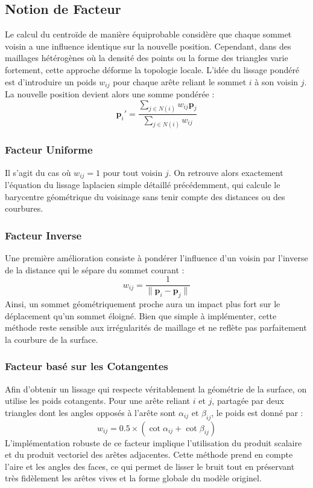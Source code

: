 \documentclass[11pt,a4paper]{article}
\begin{document}
\subsection{Notion de Facteur}
Le calcul du centroïde de manière équiprobable considère que chaque sommet voisin a une influence identique sur la nouvelle position. Cependant, dans des maillages hétérogènes où la densité des points ou la forme des triangles varie fortement, cette approche déforme la topologie locale.
L'idée du lissage pondéré est d'introduire un poids $w_{ij}$ pour chaque arête reliant le sommet $i$ à son voisin $j$. La nouvelle position devient alors une somme pondérée :
\begin{equation}
\mathbf{p}_i' = \frac{\sum_{j \in N(i)} w_{ij} \mathbf{p}_j}{\sum_{j \in N(i)} w_{ij}}
\end{equation}

\subsubsection{Facteur Uniforme}
Il s'agit du cas où $w_{ij} = 1$ pour tout voisin $j$. On retrouve alors exactement l'équation du lissage laplacien simple détaillé précédemment, qui calcule le barycentre géométrique du voisinage sans tenir compte des distances ou des courbures.
\subsubsection{Facteur Inverse}
Une première amélioration consiste à pondérer l'influence d'un voisin par l'inverse de la distance qui le sépare du sommet courant :
\begin{equation}
w_{ij} = \frac{1}{\| \mathbf{p}_i - \mathbf{p}_j \|}
\end{equation}
Ainsi, un sommet géométriquement proche aura un impact plus fort sur le déplacement qu'un sommet éloigné. Bien que simple à implémenter, cette méthode reste sensible aux irrégularités de maillage et ne reflète pas parfaitement la courbure de la surface.

\subsubsection{Facteur basé sur les Cotangentes}
Afin d'obtenir un lissage qui respecte véritablement la géométrie de la surface, on utilise les poids cotangents. Pour une arête reliant $i$ et $j$, partagée par deux triangles dont les angles opposés à l'arête sont $\alpha_{ij}$ et $\beta_{ij}$, le poids est donné par :
\begin{equation}
w_{ij} = 0.5 \times (\cot \alpha_{ij} + \cot \beta_{ij})
\end{equation}
L'implémentation robuste de ce facteur implique l'utilisation du produit scalaire et du produit vectoriel des arêtes adjacentes. Cette méthode prend en compte l'aire et les angles des faces, ce qui permet de lisser le bruit tout en préservant très fidèlement les arêtes vives et la forme globale du modèle originel.
\end{document}

